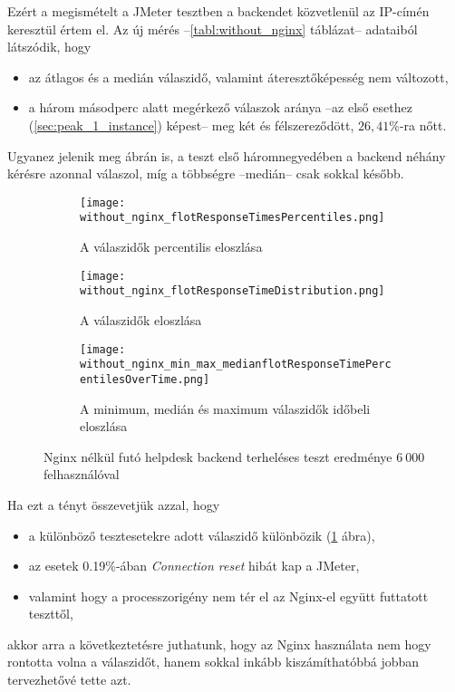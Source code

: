Ezért a megismételt a JMeter tesztben a backendet közvetlenül az IP-címén keresztül értem el. Az új mérés --\ref{tabl:without_nginx} táblázat-- adataiból látszódik, hogy

\begin{itemize}
	\item az átlagos és a medián válaszidő, valamint áteresztőképesség nem változott,
	\item a három másodperc alatt megérkező válaszok aránya --az első esethez (\ref{sec:peak_1_instance}) képest-- meg két és félszereződött, $26,41\%$-ra nőtt.
\end{itemize}



Ugyanez jelenik meg  ábrán is, a teszt első háromnegyedében a backend néhány kérésre azonnal válaszol, míg a többségre --medián-- csak sokkal később.

\begin{figure}[hbt]
	\begin{subfigure}{.49\textwidth}
		\centering
		\texttt{[image: without\_nginx\_flotResponseTimesPercentiles.png]}  
		\caption{A válaszidők percentilis eloszlása}
		\label{fig:without_nginx_percentil}
	\end{subfigure}
	\begin{subfigure}{.49\textwidth}
		\centering
		\texttt{[image: without\_nginx\_flotResponseTimeDistribution.png]}  
		\caption{A válaszidők eloszlása}
	\end{subfigure}
	
	\quad
	
	\begin{subfigure}{.95\textwidth}
		\centering
		\texttt{[image: without\_nginx\_min\_max\_medianflotResponseTimePercentilesOverTime.png]}  
		\caption{A minimum, medián és maximum válaszidők időbeli eloszlása}
		\label{fig:without_nginx_min_median_max_over_time}
	\end{subfigure}
	
	\caption[Helpdesk backend terheléses teszt Nginx nélkül]{Nginx nélkül futó helpdesk backend terheléses teszt eredménye $6~000$ felhasználóval}
\end{figure}


Ha ezt a tényt összevetjük azzal, hogy
\begin{itemize}
	\item a különböző tesztesetekre adott válaszidő különbözik (\ref{fig:without_nginx_percentil} ábra),
	\item az esetek 0.19\%-ában \textit{Connection reset} hibát kap a JMeter,
	\item valamint hogy a processzorigény nem tér el az Nginx-el együtt futtatott teszttől,
\end{itemize}
akkor arra a következtetésre juthatunk, hogy az Nginx használata nem hogy rontotta volna a válaszidőt, hanem sokkal inkább kiszámíthatóbbá jobban tervezhetővé tette azt.


